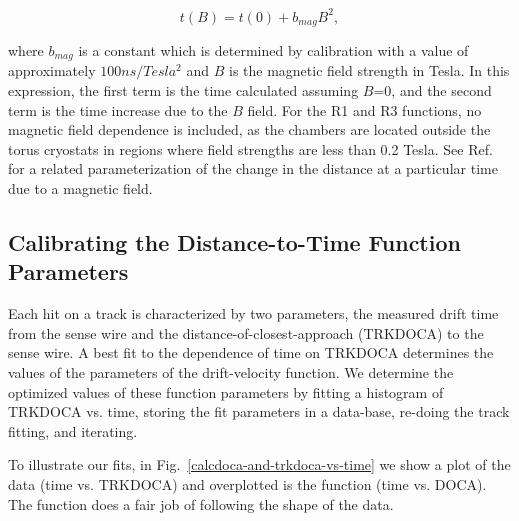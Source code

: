 \begin{equation} 
\label{eq-bmax}
t(B) = t(0) + b_{mag} B^2,
\end{equation}

\noindent
where $b_{mag}$ is a constant which is determined by calibration with a
value of approximately $100 ns/Tesla^2$ and $B$ is the magnetic field strength in Tesla. In this expression, the
first term is the time calculated assuming $B$=0, and the second term is the time increase due to the $B$
field. For the R1 and R3 functions, no magnetic field dependence is included, as the chambers are located
outside the torus cryostats in regions where field strengths are less than 0.2 Tesla.  
See Ref.~\cite{qin96} for a related
parameterization of the change in the distance at a particular time due to a magnetic field. 

\subsection{Calibrating the Distance-to-Time Function Parameters}

Each hit on a track is characterized by two parameters, the measured drift 
time from the sense wire and the distance-of-closest-approach (TRKDOCA) to the 
sense wire.  A best fit to the dependence of time on TRKDOCA determines the
values of the parameters of the drift-velocity function. 
We determine the optimized values of these function parameters by fitting
a histogram of TRKDOCA vs. time, storing the fit parameters in a data-base, re-doing
the track fitting, and iterating.

To illustrate our fits, in Fig.~\ref{calcdoca-and-trkdoca-vs-time} we show a plot of
the data (time vs. TRKDOCA) and overplotted is the function (time vs. DOCA).
The function does a fair job of following the shape of the data.

